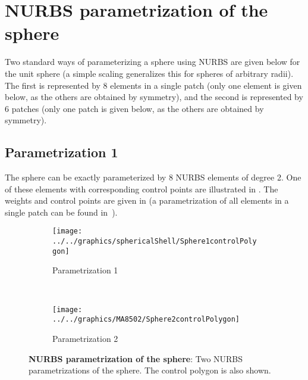 \section{NURBS parametrization of the sphere}
Two standard ways of parameterizing a sphere using NURBS are given below for the unit sphere (a simple scaling generalizes this for spheres of arbitrary radii). The first is represented by 8 elements in a single patch (only one element is given below, as the others are obtained by symmetry), and the second is represented by 6 patches (only one patch is given below, as the others are obtained by symmetry).
\subsection{Parametrization 1}
\label{Sec3:NURBSsphere1}
The sphere can be exactly parameterized by 8 NURBS elements of degree 2. One of these elements with corresponding control points are illustrated in . The weights and control points are given in  (a parametrization of all elements in a single patch can be found in~\cite[p. 168]{Venas2015iao}).
\begin{figure}
	\centering
	\begin{subfigure}{0.40\textwidth}
		\centering
		\texttt{[image: ../../graphics/sphericalShell/Sphere1controlPolygon]}
		\caption{Parametrization 1}
		\label{Fig3:parametrizationOfSphere1} 
	\end{subfigure}
	~
	\begin{subfigure}{0.55\textwidth}
		\centering
		\texttt{[image: ../../graphics/MA8502/Sphere2controlPolygon]}
		\caption{Parametrization 2}
		\label{Fig3:parametrizationOfSphere2} 
	\end{subfigure}
	\caption{\textbf{NURBS parametrization of the sphere}: Two NURBS parametrizations of the sphere. The control polygon is also shown.}       
\end{figure}

